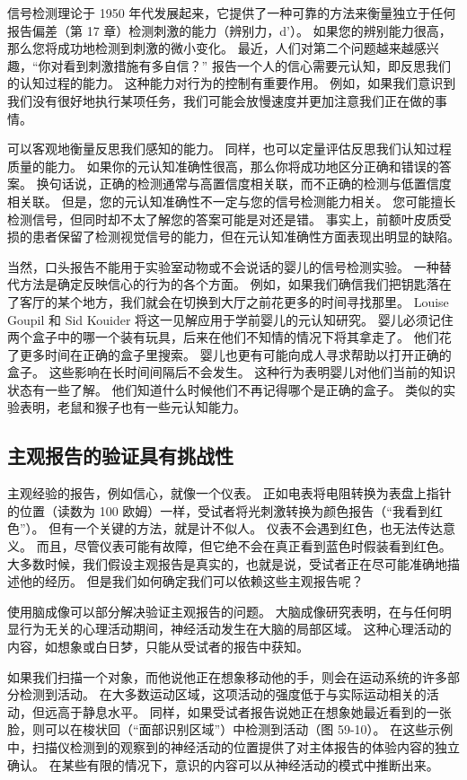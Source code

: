信号检测理论于 1950 年代发展起来，它提供了一种可靠的方法来衡量独立于任何报告偏差（第 17 章）检测刺激的能力（辨别力，d'）。 如果您的辨别能力很高，那么您将成功地检测到刺激的微小变化。 最近，人们对第二个问题越来越感兴趣，“你对看到刺激措施有多自信？” 报告一个人的信心需要元认知，即反思我们的认知过程的能力。 这种能力对行为的控制有重要作用。 例如，如果我们意识到我们没有很好地执行某项任务，我们可能会放慢速度并更加注意我们正在做的事情。

可以客观地衡量反思我们感知的能力。 同样，也可以定量评估反思我们认知过程质量的能力。 如果你的元认知准确性很高，那么你将成功地区分正确和错误的答案。 换句话说，正确的检测通常与高置信度相关联，而不正确的检测与低置信度相关联。 但是，您的元认知准确性不一定与您的信号检测能力相关。 您可能擅长检测信号，但同时却不太了解您的答案可能是对还是错。 事实上，前额叶皮质受损的患者保留了检测视觉信号的能力，但在元认知准确性方面表现出明显的缺陷。

当然，口头报告不能用于实验室动物或不会说话的婴儿的信号检测实验。 一种替代方法是确定反映信心的行为的各个方面。 例如，如果我们确信我们把钥匙落在了客厅的某个地方，我们就会在切换到大厅之前花更多的时间寻找那里。 Louise Goupil 和 Sid Kouider 将这一见解应用于学前婴儿的元认知研究。 婴儿必须记住两个盒子中的哪一个装有玩具，后来在他们不知情的情况下将其拿走了。 他们花了更多时间在正确的盒子里搜索。 婴儿也更有可能向成人寻求帮助以打开正确的盒子。 这些影响在长时间间隔后不会发生。 这种行为表明婴儿对他们当前的知识状态有一些了解。 他们知道什么时候他们不再记得哪个是正确的盒子。 类似的实验表明，老鼠和猴子也有一些元认知能力。

\subsection{主观报告的验证具有挑战性}
主观经验的报告，例如信心，就像一个仪表。 正如电表将电阻转换为表盘上指针的位置（读数为 100 欧姆）一样，受试者将光刺激转换为颜色报告（“我看到红色”）。 但有一个关键的方法，就是计不似人。 仪表不会遇到红色，也无法传达意义。 而且，尽管仪表可能有故障，但它绝不会在真正看到蓝色时假装看到红色。 大多数时候，我们假设主观报告是真实的，也就是说，受试者正在尽可能准确地描述他的经历。 但是我们如何确定我们可以依赖这些主观报告呢？

使用脑成像可以部分解决验证主观报告的问题。 大脑成像研究表明，在与任何明显行为无关的心理活动期间，神经活动发生在大脑的局部区域。 这种心理活动的内容，如想象或白日梦，只能从受试者的报告中获知。

如果我们扫描一个对象，而他说他正在想象移动他的手，则会在运动系统的许多部分检测到活动。 在大多数运动区域，这项活动的强度低于与实际运动相关的活动，但远高于静息水平。 同样，如果受试者报告说她正在想象她最近看到的一张脸，则可以在梭状回（“面部识别区域”）中检测到活动（图 59-10）。 在这些示例中，扫描仪检测到的观察到的神经活动的位置提供了对主体报告的体验内容的独立确认。 在某些有限的情况下，意识的内容可以从神经活动的模式中推断出来。

